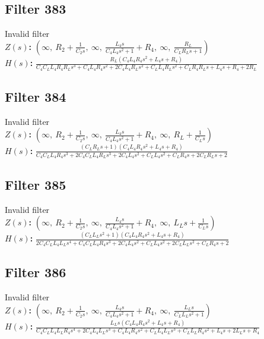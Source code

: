\documentclass{article}
\begin{document}
\subsection*{Filter 383}
Invalid filter \\ 
\textbf{$Z(s)$:} $\left( \infty, \  R_{2} + \frac{1}{C_{2} s}, \  \infty, \  \frac{L_{4} s}{C_{4} L_{4} s^{2} + 1} + R_{4}, \  \infty, \  \frac{R_{L}}{C_{L} R_{L} s + 1}\right)$ \\ 
\textbf{$H(s)$:} $\frac{R_{L} \left(C_{4} L_{4} R_{4} s^{2} + L_{4} s + R_{4}\right)}{C_{4} C_{L} L_{4} R_{4} R_{L} s^{3} + C_{4} L_{4} R_{4} s^{2} + 2 C_{4} L_{4} R_{L} s^{2} + C_{L} L_{4} R_{L} s^{2} + C_{L} R_{4} R_{L} s + L_{4} s + R_{4} + 2 R_{L}}$ \\ 
\subsection*{Filter 384}
Invalid filter \\ 
\textbf{$Z(s)$:} $\left( \infty, \  R_{2} + \frac{1}{C_{2} s}, \  \infty, \  \frac{L_{4} s}{C_{4} L_{4} s^{2} + 1} + R_{4}, \  \infty, \  R_{L} + \frac{1}{C_{L} s}\right)$ \\ 
\textbf{$H(s)$:} $\frac{\left(C_{L} R_{L} s + 1\right) \left(C_{4} L_{4} R_{4} s^{2} + L_{4} s + R_{4}\right)}{C_{4} C_{L} L_{4} R_{4} s^{3} + 2 C_{4} C_{L} L_{4} R_{L} s^{3} + 2 C_{4} L_{4} s^{2} + C_{L} L_{4} s^{2} + C_{L} R_{4} s + 2 C_{L} R_{L} s + 2}$ \\ 
\subsection*{Filter 385}
Invalid filter \\ 
\textbf{$Z(s)$:} $\left( \infty, \  R_{2} + \frac{1}{C_{2} s}, \  \infty, \  \frac{L_{4} s}{C_{4} L_{4} s^{2} + 1} + R_{4}, \  \infty, \  L_{L} s + \frac{1}{C_{L} s}\right)$ \\ 
\textbf{$H(s)$:} $\frac{\left(C_{L} L_{L} s^{2} + 1\right) \left(C_{4} L_{4} R_{4} s^{2} + L_{4} s + R_{4}\right)}{2 C_{4} C_{L} L_{4} L_{L} s^{4} + C_{4} C_{L} L_{4} R_{4} s^{3} + 2 C_{4} L_{4} s^{2} + C_{L} L_{4} s^{2} + 2 C_{L} L_{L} s^{2} + C_{L} R_{4} s + 2}$ \\ 
\subsection*{Filter 386}
Invalid filter \\ 
\textbf{$Z(s)$:} $\left( \infty, \  R_{2} + \frac{1}{C_{2} s}, \  \infty, \  \frac{L_{4} s}{C_{4} L_{4} s^{2} + 1} + R_{4}, \  \infty, \  \frac{L_{L} s}{C_{L} L_{L} s^{2} + 1}\right)$ \\ 
\textbf{$H(s)$:} $\frac{L_{L} s \left(C_{4} L_{4} R_{4} s^{2} + L_{4} s + R_{4}\right)}{C_{4} C_{L} L_{4} L_{L} R_{4} s^{4} + 2 C_{4} L_{4} L_{L} s^{3} + C_{4} L_{4} R_{4} s^{2} + C_{L} L_{4} L_{L} s^{3} + C_{L} L_{L} R_{4} s^{2} + L_{4} s + 2 L_{L} s + R_{4}}$ \\ 
\end{document}
